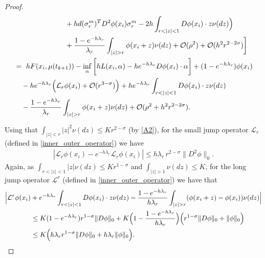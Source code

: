 \documentclass[a4paper,  twoside, 10pt, leqno]{amsart}
\theoremstyle{remark}
\theoremstyle{definition}
\begin{document}
\begin{proof}
\begin{align}
\notag        & \hspace{2.5cm} + h d ( \sigma_{r}^{m} )^{T} D^{2} \phi ( x_{i} ) \sigma_{r}^{m} - 2 h \int_{ r < |z| < 1 } D \phi ( x_{i} ) \cdot z \nu ( dz ) \Big) \\
\notag        & \hspace{2.5cm} + \frac{1-e^{-h\lambda_r}}{\lambda_r} \int_{|z| > r}  \phi (x_{i} + z )  \nu (dz) + \mathcal{O} ( \rho^{2} ) + \mathcal{O}(h^2 r^{2-2\sigma} )\bigg] \\
        & = \  h F ( x_{i}, \mu ( t_{k+1} ) ) - \inf_{\alpha} \bigg[  h L ( x_{i}, \alpha ) - h e^{-h \lambda_{r}}   D \phi ( x_{i} ) \cdot \alpha \bigg] + ( 1 -  e^{-h \lambda_{r}}) \phi ( x_{i})  \\ 
\notag        &\quad  - h e^{-h \lambda_{r}} \Big(\mathcal{L}_{r} \phi ( x_{i} ) +\mathcal{O}(r^{3-\sigma})\Big)  +  h e^{-h \lambda_{r}} \int_{ r < |z|< 1 } D \phi ( x_{i} ) \cdot z \nu ( dz )  \\
\notag        & \quad -  \frac{1-e^{-h\lambda_r}}{\lambda_r} \int_{|z|> r}  \phi (x_{i} + z ) \nu (dz) + \mathcal{O} ( \rho^{2} + h^2 r^{2-2\sigma}).
    \end{align}

 \noindent Using that $\int_{|z|<r} |z|^2 \nu(dz)\leq K r^{2-\sigma}$ (by \ref{A2}), 
 for the small jump operator $\mathcal{L}_{r}$ (defined in \eqref{inner_outer_operator}) we have 
 \begin{align}\label{consist_esti1}
 |\mathcal{L}_r\phi(x_i) - e^{-h\lambda_r}\mathcal{L}_r\phi(x_i)|\leq h\lambda_r \, r^{2-\sigma}\|D^2\phi\|_{0}.
\end{align}    
Again, as $\int_{r<|z|<1} |z|\nu(dz)\leq K r^{1-\sigma}$ and $\int_{|z|>1} \nu(dz)\leq K$, 
for the long jump operator $\mathcal{L}^{r}$ (defined in \eqref{inner_outer_operator}) we have  that
\begin{align}\label{consist_esti2}
  \notag       \Big|\mathcal{L}^r\phi(x_i) & +e^{-h \lambda_{r}} \int_{ r <|z| < 1} D \phi ( x_{i} ) \cdot z \nu ( dz ) - \frac{1-e^{-h\lambda_r}}{h \lambda_r} \int_{|z| > r}  (\phi (x_{i} + z ) - \phi(x_i)) \nu (dz)\Big|\\
 \notag  & \leq    K (1-e^{-h \lambda_{r}}) r^{1-\sigma} \|D\phi\|_0  + K \Big(1-\frac{1-e^{-h\lambda_r}}{h \lambda_r}\Big) \Big( r^{1-\sigma} \|D\phi\|_0  + \|\phi\|_0 \Big) \\
         & \leq  K \Big( h \lambda_r r^{1-\sigma} \|D\phi\|_0 + h\lambda_r \|\phi\|_0\Big). 
\end{align} 


\end{proof}
\end{document}
